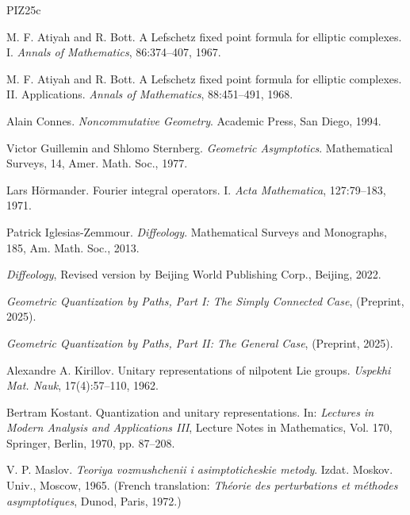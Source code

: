 \documentclass[11pt,reqno,letterpaper,twoside]{amsart}
\theoremstyle{articlestyle}
\theoremstyle{plain}
\theoremstyle{definition}
\newcommand{\0}{\hat{0}}
\newcommand{\1}{\hat{1}}
\begin{document}
  
  \begin{thebibliography}{PIZ25c}
    
    M. F. Atiyah and R. Bott.
    A Lefschetz fixed point formula for elliptic complexes. I.
    {\em Annals of Mathematics}, 86:374--407, 1967.
    
    M. F. Atiyah and R. Bott.
    A Lefschetz fixed point formula for elliptic complexes. II. Applications.
    {\em Annals of Mathematics}, 88:451--491, 1968.
    
    Alain Connes.
    {\em Noncommutative Geometry}.
    Academic Press, San Diego, 1994.
    
    Victor Guillemin and Shlomo Sternberg.
    \emph{Geometric Asymptotics}.
    Mathematical Surveys, 14, Amer. Math. Soc., 1977.
    
    Lars H\"ormander.
    Fourier integral operators. I.
    {\em Acta Mathematica}, 127:79--183, 1971.
    
    Patrick Iglesias-Zemmour.
    {\em Diffeology}.
    Mathematical Surveys and Monographs, 185, Am. Math. Soc., 2013.
    
    \bysame %
    \emph{Diffeology},
    Revised version by Beijing World Publishing Corp., Beijing, 2022.
    
    \bysame %
    \emph{Geometric Quantization by Paths, Part I: The Simply Connected Case},
    (Preprint, 2025).
    
    \bysame %
    \emph{Geometric Quantization by Paths, Part II: The General Case},
    (Preprint, 2025).
    
    Alexandre A. Kirillov.
    Unitary representations of nilpotent Lie groups.
    {\em Uspekhi Mat. Nauk}, 17(4):57--110, 1962.
    
    Bertram Kostant.
    Quantization and unitary representations.
    In: {\em Lectures in Modern Analysis and Applications III},
    Lecture Notes in Mathematics, Vol. 170,
    Springer, Berlin, 1970, pp. 87--208.
    
    V. P. Maslov.
    {\em Teoriya vozmushchenii i asimptoticheskie metody}.
    Izdat. Moskov. Univ., Moscow, 1965.
    (French translation: {\em Th\'eorie des perturbations et m\'ethodes asymptotiques}, Dunod, Paris, 1972.)
    

\end{thebibliography}
\end{document}
